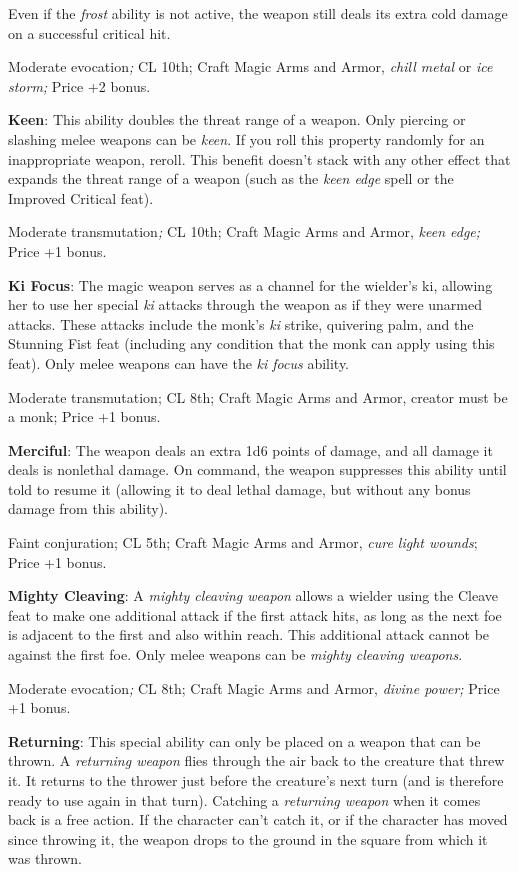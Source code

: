 Even if the \textit{frost} ability is not active, the weapon still deals its extra cold damage on a successful critical hit.
				
Moderate evocation\textit{; }CL 10th; Craft Magic Arms and Armor, \textit{chill metal }or \textit{ice storm; }Price +2 bonus.
				
\textbf{Keen}: This ability doubles the threat range of a weapon. Only piercing or slashing melee weapons can be \textit{keen}. If you roll this property randomly for an inappropriate weapon, reroll. This benefit doesn't stack with any other effect that expands the threat range of a weapon (such as the \textit{keen edge }spell or the Improved Critical feat).
				
Moderate transmutation\textit{; }CL 10th; Craft Magic Arms and Armor, \textit{keen edge; }Price +1 bonus.
				
\textbf{Ki Focus}: The magic weapon serves as a channel for the wielder's ki, allowing her to use her special \textit{ki }attacks through the weapon as if they were unarmed attacks. These attacks include the monk's \textit{ki }strike, quivering palm, and the Stunning Fist feat (including any condition that the monk can apply using this feat). Only melee weapons can have the \textit{ki focus} ability.
				
Moderate transmutation; CL 8th; Craft Magic Arms and Armor, creator must be a monk; Price +1 bonus.
				
\textbf{Merciful}: The weapon deals an extra 1d6 points of damage, and all damage it deals is nonlethal damage. On command, the weapon suppresses this ability until told to resume it (allowing it to deal lethal damage, but without any bonus damage from this ability).
				
Faint conjuration; CL 5th; Craft Magic Arms and Armor, \textit{cure light wounds}; Price +1 bonus.
				
\textbf{Mighty Cleaving}: A \textit{mighty cleaving weapon} allows a wielder using the Cleave feat to make one additional attack if the first attack hits, as long as the next foe is adjacent to the first and also within reach. This additional attack cannot be against the first foe. Only melee weapons can be \textit{mighty cleaving weapons}.
				
Moderate evocation\textit{; }CL 8th; Craft Magic Arms and Armor, \textit{divine power; }Price +1 bonus.
				
\textbf{Returning}: This special ability can only be placed on a weapon that can be thrown. A \textit{returning weapon} flies through the air back to the creature that threw it. It returns to the thrower just before the creature's next turn (and is therefore ready to use again in that turn). Catching a \textit{returning weapon} when it comes back is a free action. If the character can't catch it, or if the character has moved since throwing it, the weapon drops to the ground in the square from which it was thrown.
				
